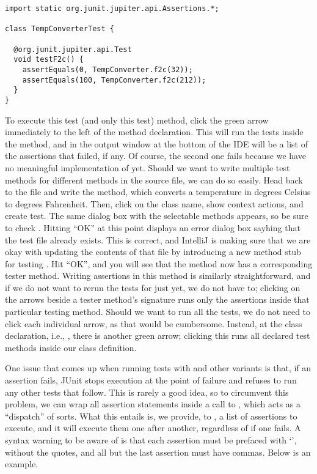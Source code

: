 \begin{cl}[]{}
\begin{lstlisting}[language=MyJava]
import static org.junit.jupiter.api.Assertions.*;

class TempConverterTest {

  @org.junit.jupiter.api.Test
  void testF2c() {
    assertEquals(0, TempConverter.f2c(32));
    assertEquals(100, TempConverter.f2c(212));
  }
}
\end{lstlisting}
\end{cl}

To execute this test (and only this test) method, click the green arrow immediately to the left of the method declaration. This will run the tests inside the method, and in the output window at the bottom of the IDE will be a list of the assertions that failed, if any. Of course, the second one fails because we have no meaningful implementation of  yet. Should we want to write multiple test methods for different methods in the source file, we can do so easily. Head back to the  file and write the  method, which converts a temperature in degrees Celsius to degrees Fahrenheit. Then, click on the class name, show context actions, and create test. The same dialog box with the selectable methods appears, so be sure to check . Hitting ``OK'' at this point displays an error dialog box sayhing that the test file already exists. This is correct, and IntelliJ is making sure that we are okay with updating the contents of that file by introducing a new method stub for testing . Hit ``OK'', and you will see that the  method now has a corresponding tester method. Writing assertions in this method is similarly straightforward, and if we do not want to rerun the tests for  just yet, we do not have to; clicking on the arrows beside a tester method's signature runs only the assertions inside that particular testing method. Should we want to run all the tests, we do not need to click each individual arrow, as that would be cumbersome. Instead, at the class declaration, i.e., , there is another green arrow; clicking this runs all declared test methods inside our class definition.

One issue that comes up when running tests with  and other variants is that, if an assertion fails, JUnit stops execution at the point of failure and refuses to run any other tests that follow. This is rarely a good idea, so to circumvent this problem, we can wrap all assertion statements inside a call to , which acts as a ``dispatch'' of sorts. What this entails is, we provide, to , a list of assertions to execute, and it will execute them one after another, regardless of if one fails. A syntax warning to be aware of is that each assertion must be prefaced with `\ttt{() -> }', without the quotes, and all but the last assertion must have commas. Below is an example.

